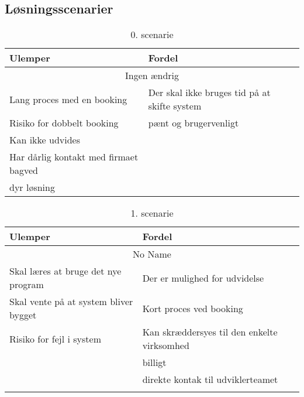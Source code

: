 \subsection{Løsningsscenarier}


\begin{table}[]
\caption{0. scenarie}
\label{0scenarie}
\begin{tabular}{|l|l|}
\hline
Ulemper                               & \cellcolor[HTML]{C0C0C0}Fordel                                       \\ \hline
\multicolumn{2}{|c|}{Ingen ændrig}                                                                           \\ \hline
Lang proces med en booking            & \cellcolor[HTML]{C0C0C0}Der skal ikke bruges tid på at skifte system \\ \hline
Risiko for dobbelt booking            & \cellcolor[HTML]{C0C0C0}pænt og brugervenligt                        \\ \hline
Kan ikke udvides                      & \cellcolor[HTML]{C0C0C0}                                             \\ \hline
Har dårlig kontakt med firmaet bagved & \cellcolor[HTML]{C0C0C0}                                             \\ \hline
dyr løsning                           & \cellcolor[HTML]{C0C0C0}                                             \\ \hline
\end{tabular}
\end{table}


\begin{table}[]
\caption{1. scenarie}
\label{1scenarie}
\begin{tabular}{|l|l|}
\hline
Ulemper                               & \cellcolor[HTML]{C0C0C0}Fordel                                               \\ \hline
\multicolumn{2}{|c|}{No Name}                                                                                        \\ \hline
Skal læres at bruge det nye program   & \cellcolor[HTML]{C0C0C0}Der er mulighed for udvidelse                        \\ \hline
Skal vente på at system bliver bygget & \cellcolor[HTML]{C0C0C0}Kort proces ved booking                              \\ \hline
Risiko for fejl i system              & \cellcolor[HTML]{C0C0C0}Kan skræddersyes til den enkelte virksomhed          \\ \hline
                                      & \cellcolor[HTML]{C0C0C0}billigt                                              \\ \hline
                                      & \cellcolor[HTML]{C0C0C0}direkte kontak til udviklerteamet                    \\ \hline
                                      & \cellcolor[HTML]{C0C0C0}{\color[HTML]{333333} Brugervenligt og overskueligt} \\ \hline
\end{tabular}
\end{table}

